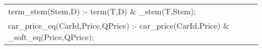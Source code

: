 \begin{tabular}{l}
term\_stem(Stem,D) :- term(T,D) \& \_stem(T,Stem);\\
car\_price\_eq(CarId,Price,QPrice) :- car\_price(CarId,Price) \& \_soft\_eq(Price,QPrice);\\
\end{tabular}
